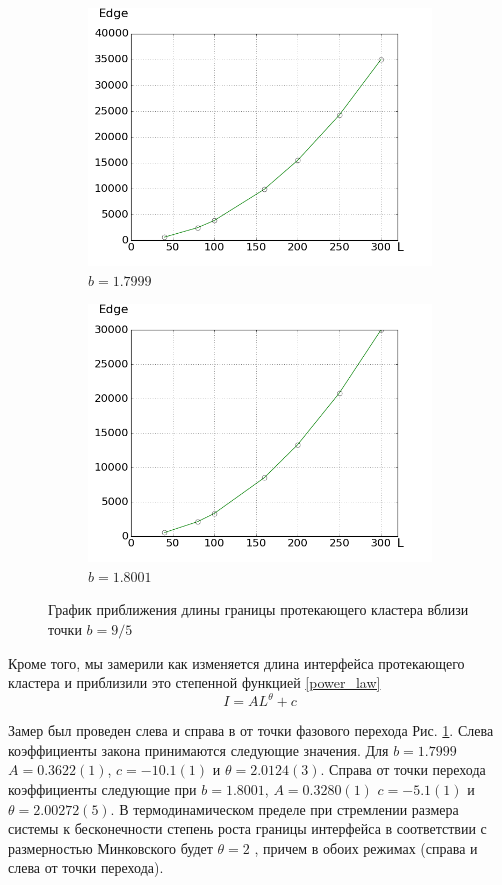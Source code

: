 \documentclass[a4paper]{article}
\begin{document}
	\begin{figure}
		\begin{subfigure}{.6\textwidth}
			\includegraphics[width=.8\linewidth]{old_edge_left.png}
			\caption{$b=1.7999$}
		\end{subfigure}
		\begin{subfigure}{.6\textwidth}
			\includegraphics[width=.8\linewidth]{old_edge_right.png}
			\caption{$b=1.8001$}
		\end{subfigure}
		\caption{График приближения длины границы протекающего кластера вблизи точки $b=9/5$}
		\label{old_edge}
	\end{figure}
		
	\par Кроме того, мы замерили как изменяется длина интерфейса протекающего кластера и приблизили это степенной функцией \ref{power_law}
	\begin{equation}
		I = AL^{\theta} +c
		\label{power_law}
	\end{equation}
	
	\par Замер был проведен слева и справа в от точки фазового перехода Рис. \ref{old_edge}. Слева коэффициенты закона принимаются следующие значения. Для $b=1.7999$ $A=0.3622(1)$, $c=-10.1(1)$ и $\theta=	2.0124(3)$. Справа от точки перехода коэффициенты следующие при $b=1.8001$, $A=0.3280(1)$ $c=-5.1(1)$ и $\theta=2.00272(5) $. В термодинамическом пределе при стремлении размера системы к бесконечности степень роста границы интерфейса в соответствии с размерностью Минковского будет $\theta = 2$ \cite{me}, причем в обоих режимах (справа и слева от точки перехода).
	
\end{document}
